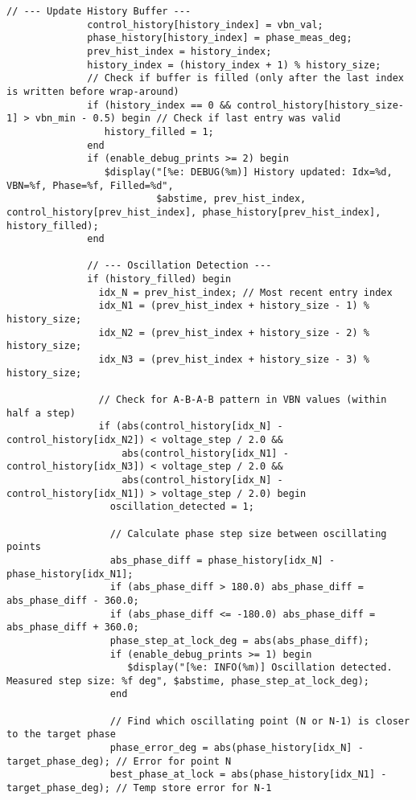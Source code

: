 \begin{lstlisting}[caption={Verilog-A Generic Vb Tuner Implementation}]
              // --- Update History Buffer ---
              control_history[history_index] = vbn_val;
              phase_history[history_index] = phase_meas_deg;
              prev_hist_index = history_index;
              history_index = (history_index + 1) % history_size;
              // Check if buffer is filled (only after the last index is written before wrap-around)
              if (history_index == 0 && control_history[history_size-1] > vbn_min - 0.5) begin // Check if last entry was valid
                 history_filled = 1;
              end
              if (enable_debug_prints >= 2) begin
                 $display("[%e: DEBUG(%m)] History updated: Idx=%d, VBN=%f, Phase=%f, Filled=%d",
                          $abstime, prev_hist_index, control_history[prev_hist_index], phase_history[prev_hist_index], history_filled);
              end

              // --- Oscillation Detection ---
              if (history_filled) begin
                idx_N = prev_hist_index; // Most recent entry index
                idx_N1 = (prev_hist_index + history_size - 1) % history_size;
                idx_N2 = (prev_hist_index + history_size - 2) % history_size;
                idx_N3 = (prev_hist_index + history_size - 3) % history_size;

                // Check for A-B-A-B pattern in VBN values (within half a step)
                if (abs(control_history[idx_N] - control_history[idx_N2]) < voltage_step / 2.0 &&
                    abs(control_history[idx_N1] - control_history[idx_N3]) < voltage_step / 2.0 &&
                    abs(control_history[idx_N] - control_history[idx_N1]) > voltage_step / 2.0) begin
                  oscillation_detected = 1;

                  // Calculate phase step size between oscillating points
                  abs_phase_diff = phase_history[idx_N] - phase_history[idx_N1];
                  if (abs_phase_diff > 180.0) abs_phase_diff = abs_phase_diff - 360.0;
                  if (abs_phase_diff <= -180.0) abs_phase_diff = abs_phase_diff + 360.0;
                  phase_step_at_lock_deg = abs(abs_phase_diff);
                  if (enable_debug_prints >= 1) begin
                     $display("[%e: INFO(%m)] Oscillation detected. Measured step size: %f deg", $abstime, phase_step_at_lock_deg);
                  end

                  // Find which oscillating point (N or N-1) is closer to the target phase
                  phase_error_deg = abs(phase_history[idx_N] - target_phase_deg); // Error for point N
                  best_phase_at_lock = abs(phase_history[idx_N1] - target_phase_deg); // Temp store error for N-1


\end{lstlisting}
